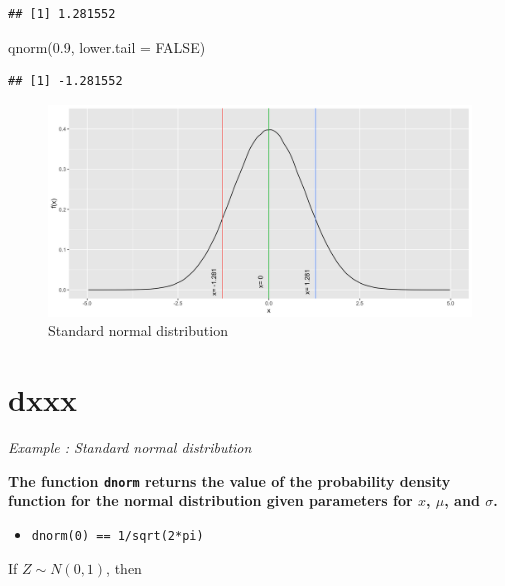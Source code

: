 \documentclass[
]{book}
\newenvironment{Shaded}{\begin{snugshade}}{\end{snugshade}}
\newcommand{\AttributeTok}[1]{\textcolor[rgb]{0.77,0.63,0.00}{#1}}
\newcommand{\ConstantTok}[1]{\textcolor[rgb]{0.00,0.00,0.00}{#1}}
\newcommand{\FloatTok}[1]{\textcolor[rgb]{0.00,0.00,0.81}{#1}}
\newcommand{\FunctionTok}[1]{\textcolor[rgb]{0.00,0.00,0.00}{#1}}
\newcommand{\NormalTok}[1]{#1}
\providecommand{\tightlist}{%
  \setlength{\itemsep}{0pt}\setlength{\parskip}{0pt}}
\begin{document}
\begin{verbatim}
## [1] 1.281552
\end{verbatim}

\begin{Shaded}
\begin{Highlighting}[]
\FunctionTok{qnorm}\NormalTok{(}\FloatTok{0.9}\NormalTok{,  }\AttributeTok{lower.tail =} \ConstantTok{FALSE}\NormalTok{)}
\end{Highlighting}
\end{Shaded}

\begin{verbatim}
## [1] -1.281552
\end{verbatim}

\begin{figure}

{\centering \includegraphics{figure/norm3-1} 

}

\caption{Standard normal distribution}\label{fig:norm3}
\end{figure}

\hypertarget{dxxx}{%
\section{dxxx}\label{dxxx}}

\emph{Example : Standard normal distribution}

\textbf{The function \texttt{dnorm} returns the value of the probability density function for the normal distribution given parameters for \(x\), \(\mu\), and \(\sigma\).}

\begin{itemize}
\tightlist
\item
  \texttt{dnorm(0)\ ==\ 1/sqrt(2*pi)}
\end{itemize}

If \(Z\sim N(0,1)\), then
\end{document}

